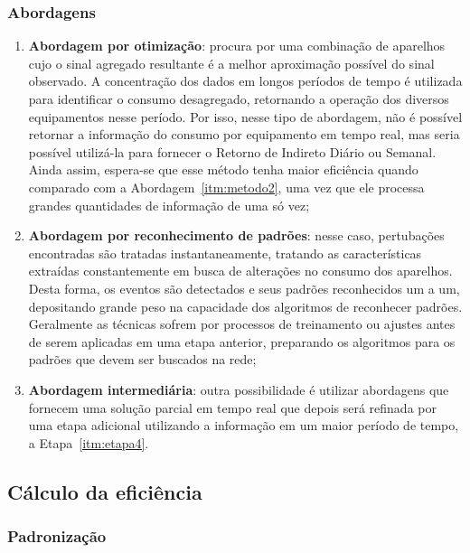 \subsubsection[Abordagens]{Abordagens \cite{nilm_zeifman_review_2011}}
\label{top:metodos}

\begin{enumerate}
\item\label{itm:metodo1}\textbf{Abordagem por otimização}: procura por
uma combinação de aparelhos cujo o sinal agregado resultante é a
melhor aproximação possível do sinal observado. A concentração dos
dados em longos períodos de tempo é utilizada para identificar o
consumo desagregado, retornando a operação dos diversos equipamentos
nesse período. Por isso, nesse tipo de abordagem, não é possível
retornar a informação do consumo por equipamento em tempo real, mas
seria possível utilizá-la para fornecer o Retorno de Indireto Diário
ou Semanal. Ainda assim, espera-se que esse método tenha maior
eficiência quando comparado com a Abordagem~\ref{itm:metodo2}, uma vez
que ele processa grandes quantidades de informação de uma só vez;
\item\label{itm:metodo2}\textbf{Abordagem por reconhecimento de
padrões}: nesse caso, pertubações encontradas são tratadas
instantaneamente, tratando as características extraídas constantemente
em busca de alterações no consumo dos aparelhos. Desta forma, os
eventos são detectados e seus padrões reconhecidos um a um,
depositando grande peso na capacidade dos algoritmos de reconhecer
padrões. Geralmente as técnicas sofrem por processos de treinamento
ou ajustes antes de serem aplicadas em uma etapa anterior, preparando
os algoritmos para os padrões que devem ser buscados na rede;
\item\label{itm:metodo3}\textbf{Abordagem intermediária}: outra
possibilidade é utilizar abordagens que fornecem uma solução parcial
em tempo real que depois será refinada por uma etapa adicional
utilizando a informação em um maior período de tempo, a
Etapa~\ref{itm:etapa4}.
\end{enumerate}

\subsection{Cálculo da eficiência}
\label{ssec:nilm_eff_calc}

\subsubsection{Padronização}
\label{sssec:nilm_padrao}

